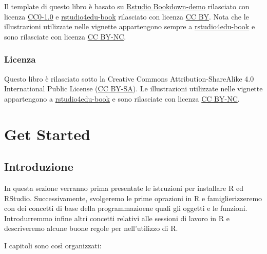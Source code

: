 \documentclass[
]{book}
\begin{document}
Il template di questo libro è basato su \href{https://github.com/rstudio/bookdown-demo}{Rstudio Bookdown-demo} rilasciato con licenza \href{https://creativecommons.org/publicdomain/zero/1.0/}{CC0-1.0} e \href{https://rstudio4edu.github.io/rstudio4edu-book/}{rstudio4edu-book} rilasciato con licenza \href{https://creativecommons.org/licenses/by/2.0/}{CC BY}. Nota che le illustrazioni utilizzate nelle vignette appartengono sempre a \href{https://rstudio4edu.github.io/rstudio4edu-book/}{rstudio4edu-book} e sono rilasciate con licenza \href{https://creativecommons.org/licenses/by-nc/2.0/}{CC BY-NC}.

\hypertarget{licenza}{%
\section*{Licenza}\label{licenza}}

Questo libro è rilasciato sotto la Creative Commons Attribution-ShareAlike 4.0 International Public License (\href{https://creativecommons.org/licenses/by-sa/4.0/legalcode}{CC BY-SA}).
Le illustrazioni utilizzate nelle vignette appartengono a \href{https://rstudio4edu.github.io/rstudio4edu-book/}{rstudio4edu-book} e sono rilasciate con licenza \href{https://creativecommons.org/licenses/by-nc/2.0/}{CC BY-NC}.

\hypertarget{part-get-started}{%
\part*{Get Started}\label{part-get-started}}

\hypertarget{introduzione}{%
\chapter*{Introduzione}\label{introduzione}}

In questa sezione verranno prima presentate le istruzioni per installare R ed RStudio. Successivamente, svolgeremo le prime oprazioni in R e famiglierizzeremo con dei concetti di base della programmazioene quali gli oggetti e le funzioni. Introdurremmo infine altri concetti relativi alle sessioni di lavoro in R e descriveremo alcune buone regole per nell'utilizzo di R.

I capitoli sono così organizzati:
\end{document}
